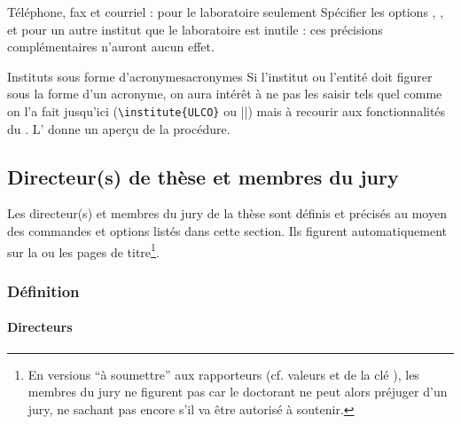 %
\begin{dbremark}{Téléphone, fax et courriel : pour le
    laboratoire seulement}{}
  Spécifier les options , ,  et
   pour un autre institut que le laboratoire est inutile :
  ces précisions complémentaires n'auront aucun effet.
\end{dbremark}
%
\begin{dbremark}{Instituts sous forme d'acronymes}{acronymes}
  Si l'institut ou l'entité doit figurer sous la forme d'un acronyme, on aura
  intérêt à ne pas les saisir tels quel comme on l'a fait jusqu'ici
  (\lstinline[deletekeywords={[5]institute}]|\institute{ULCO}| ou
  ||) mais à recourir aux fonctionnalités du
  . L' donne un aperçu de la procédure.
\end{dbremark}

\subsection{Directeur(s) de thèse et membres du jury}\label{sec-jury}


Les directeur(s) et membres du jury de la thèse sont définis et précisés au
moyen des commandes et options listés dans cette section. Ils figurent
automatiquement sur la ou les pages de titre\footnote{En versions \enquote{à
    soumettre} aux rapporteurs (cf. valeurs \protect{} et
  \protect{} de la clé \protect{}), les
  membres du jury ne figurent pas car le doctorant ne peut alors préjuger d'un
  jury, ne sachant pas encore s'il va être autorisé à soutenir.}.

\subsubsection{Définition}\label{sec-definition-directeurs-jury}

\paragraph{Directeurs}\label{sec-definition-directeurs}
%

